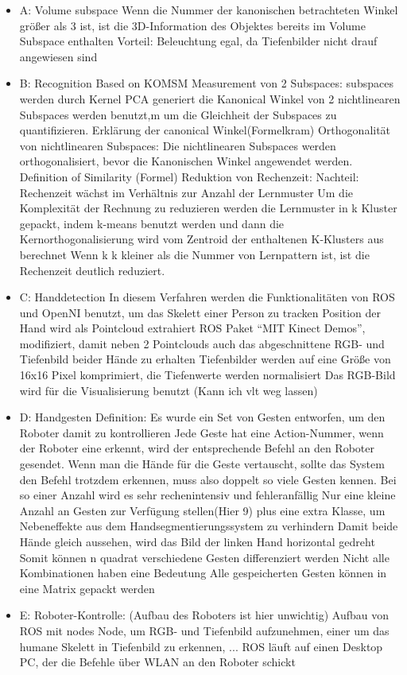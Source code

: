\begin{itemize}
\item A: Volume subspace
\subitem Wenn die Nummer der kanonischen betrachteten Winkel gr\"o\ss{}er als 3 ist, ist die 3D-Information des Objektes bereits im Volume Subspace enthalten
\subitem Vorteil: Beleuchtung egal, da Tiefenbilder nicht drauf angewiesen sind
\item B: Recognition Based on KOMSM
\subitem Measurement von 2 Subspaces: 
\subsubitem subspaces werden durch Kernel PCA generiert
\subsubitem die Kanonical Winkel von 2 nichtlinearen Subspaces werden benutzt,m um die Gleichheit der Subspaces zu quantifizieren.
\subsubitem Erkl\"arung der canonical Winkel(Formelkram)
\subitem Orthogonalität von nichtlinearen Subspaces: 
\subsubitem Die nichtlinearen Subspaces werden orthogonalisiert, bevor die Kanonischen Winkel angewendet werden.
\subitem Definition of Similarity
\subsubitem (Formel)
\subitem Reduktion von Rechenzeit:
\subsubitem Nachteil: Rechenzeit wächst im Verhältnis zur Anzahl der Lernmuster
\subsubitem Um die Komplexität der Rechnung zu reduzieren werden die Lernmuster in k Kluster gepackt, indem k-means benutzt werden und dann die Kernorthogonalisierung wird vom Zentroid der enthaltenen K-Klusters aus berechnet
\subsubitem Wenn k k kleiner als die Nummer von Lernpattern ist, ist die Rechenzeit deutlich reduziert. 
\item C: Handdetection
\subitem In diesem Verfahren werden die Funktionalitäten von ROS und OpenNI benutzt, um das Skelett einer Person zu tracken
\subitem Position der Hand wird als Pointcloud extrahiert
\subitem ROS Paket ``MIT Kinect Demos'', modifiziert, damit neben 2 Pointclouds auch das abgeschnittene RGB- und Tiefenbild beider Hände zu erhalten
\subitem Tiefenbilder werden auf eine Größe von 16x16 Pixel komprimiert, die Tiefenwerte werden normalisiert
\subitem Das RGB-Bild wird für die Visualisierung benutzt (Kann ich vlt weg lassen)
\item D: Handgesten Definition:
\subitem Es wurde ein Set von Gesten entworfen, um den Roboter damit zu kontrollieren
\subitem Jede Geste hat eine Action-Nummer, wenn der Roboter eine erkennt, wird der entsprechende Befehl an den Roboter gesendet.
\subitem Wenn man die Hände für die Geste vertauscht, sollte das System den Befehl trotzdem erkennen, muss also doppelt so viele Gesten kennen. Bei so einer Anzahl wird es sehr rechenintensiv und fehleranfällig
\subsubitem Nur eine kleine Anzahl an Gesten zur Verfügung stellen(Hier 9) plus eine extra Klasse, um Nebeneffekte aus dem Handsegmentierungssystem zu verhindern
\subitem Damit beide Hände gleich aussehen, wird das Bild der linken Hand horizontal gedreht 
\subsubitem Somit können n quadrat verschiedene Gesten differenziert werden 
\subitem Nicht alle Kombinationen haben eine Bedeutung
\subitem Alle gespeicherten Gesten können in eine Matrix gepackt werden 
\item E: Roboter-Kontrolle:
\subitem (Aufbau des Roboters ist hier unwichtig)
\subitem Aufbau von ROS mit nodes
\subitem Node, um RGB- und Tiefenbild aufzunehmen, einer um das humane Skelett in Tiefenbild zu erkennen, ...
\subitem ROS läuft auf einen Desktop PC, der die Befehle über WLAN an den Roboter schickt
\end{itemize}
